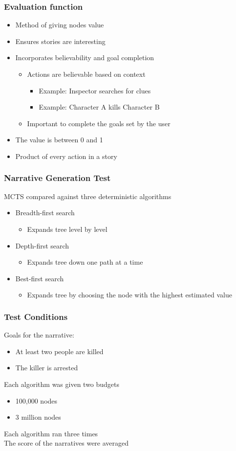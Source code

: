 \documentclass{beamer}
\begin{document}
\begin{frame}
\frametitle{Evaluation function}
\begin{itemize}
	\item Method of giving nodes value
	\item Ensures stories are interesting
	\item Incorporates believability and goal completion
	\begin{itemize}
		\item Actions are believable based on context
		\begin{itemize}
			\item Example: Inspector searches for clues
			\item Example: Character A kills Character B
		\end{itemize}
		\item Important to complete the goals set by the user
	\end{itemize}
	\item The value is between 0 and 1
	\item Product of every action in a story
\end{itemize}
\end{frame}

\begin{frame}
\frametitle{Narrative Generation Test}
MCTS compared against three deterministic algorithms
\begin{itemize}
	\item Breadth-first search
	\begin{itemize}
		\item Expands tree level by level
	\end{itemize}
	\item Depth-first search
	\begin{itemize}
		\item Expands tree down one path at a time
	\end{itemize}
	\item Best-first search
	\begin{itemize}
		\item Expands tree by choosing the node with the highest estimated value
	\end{itemize}
\end{itemize}
\end{frame}

\begin{frame}
\frametitle{Test Conditions}
Goals for the narrative:
\begin{itemize}
	\item At least two people are killed
	\item The killer is arrested
\end{itemize}
Each algorithm was given two budgets
\begin{itemize}
	\item 100,000 nodes
	\item 3 million nodes
\end{itemize}
Each algorithm ran three times \\
The score of the narratives were averaged
\end{frame}
\end{document}
